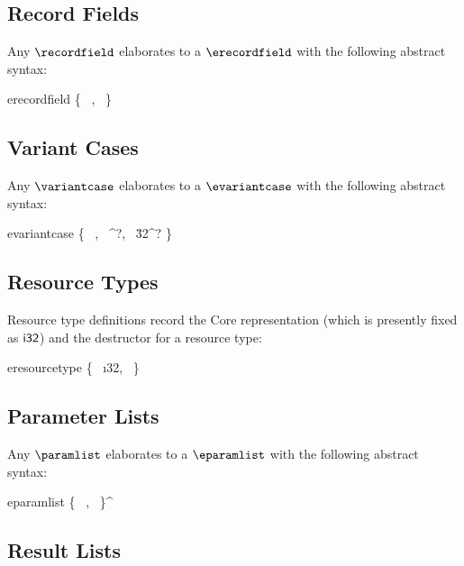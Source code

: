 \subsection{Record Fields}

Any $\recordfield$ elaborates to a $\erecordfield$ with the following
abstract syntax:

\begin{record-production}{erecordfield}
  \{ \ERFNAME~\name, \ERFTYPE~\evaltype \}
\end{record-production}

\subsection{Variant Cases}

Any $\variantcase$ elaborates to a $\evariantcase$ with the following
abstract syntax:

\begin{record-production}{evariantcase}
  \{ \EVCNAME~\name, \EVCTYPE~\evaltype^?, \EVCREFINES~\u32^? \}
\end{record-production}

\subsection{Resource Types}

Resource type definitions record the Core representation (which is
presently fixed as $\i32$) and the destructor for a resource type:

\begin{record-production}{eresourcetype}
  \{ \ERTREP~\i32, \ERTDTOR~\funcidx \}
\end{record-production}

\subsection{Parameter Lists}

Any $\paramlist$ elaborates to a $\eparamlist$ with the following
abstract syntax:

\begin{record-production}{eparamlist}
  \{ \EPLNAME~\name, \EPLTYPE~\evaltype \}^\ast
\end{record-production}

\subsection{Result Lists}


